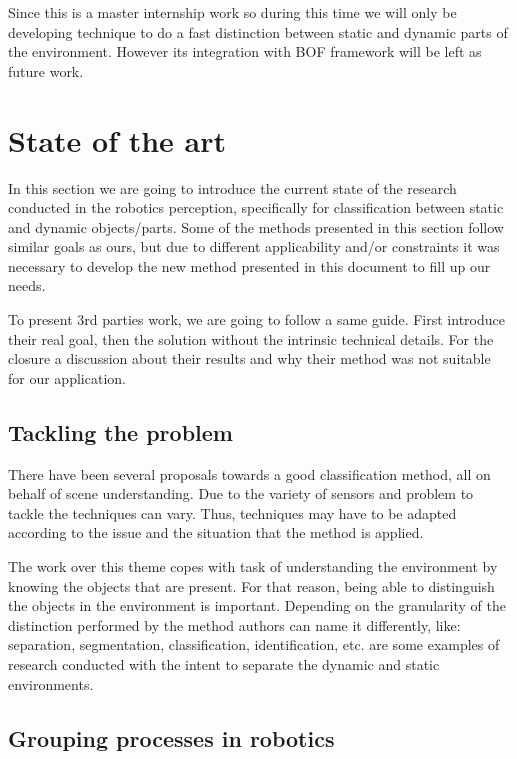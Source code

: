 Since this is a master internship work so during this time we will only be developing technique to do a fast distinction between static and dynamic parts of the environment. However its integration with BOF framework will be left as future work.

\section{State of the art}
In this section we are going to introduce the current state of the research conducted in the robotics perception, specifically for classification between static and dynamic objects/parts. Some of the methods presented in this section follow similar goals as ours, but due to different applicability and/or constraints it was necessary to develop the new method presented in this document to fill up our needs.

To present 3rd parties work, we are going to follow a same guide. First introduce their real goal, then the solution without the intrinsic technical details. For the closure a discussion about their results and why their method was not suitable for our application.

\subsection{Tackling the problem}

There have been several proposals towards a good classification method, all on behalf of scene understanding. Due to the variety of sensors and problem to tackle the techniques can vary. Thus, techniques may have to be adapted according to the issue and the situation that the method is applied.

The work over this theme copes with task of understanding the environment by knowing the objects that are present. For that reason, being able to distinguish the objects in the environment is important. Depending on the granularity of the distinction performed by the method authors can name it differently, like: separation, segmentation, classification, identification, etc. \cite{Wolf04onlinesimultaneous,DBLP:conf/iros/LidorisWB08} are some examples of research conducted with the intent to separate the dynamic and static environments.

\subsection{Grouping processes in robotics}

